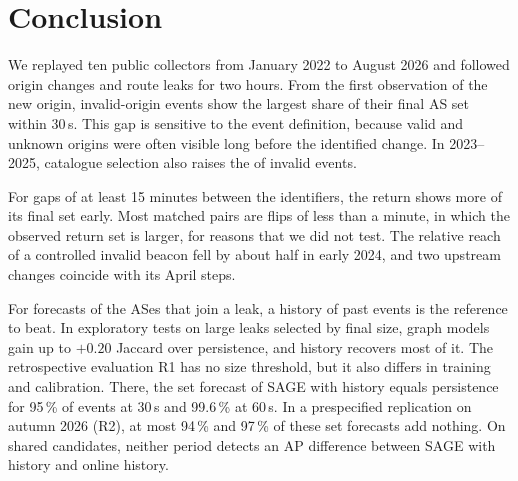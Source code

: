 \section{Conclusion}\label{sec:conclusion}

We replayed ten public collectors from January 2022 to August 2026 and followed origin changes and route leaks for two hours.
From the first observation of the new origin, invalid-origin events show the largest share of their final AS set within 30\,s.
This gap is sensitive to the event definition, because valid and unknown origins were often visible long before the identified change.
In 2023--2025, catalogue selection also raises the \floor of invalid events.

For gaps of at least 15 minutes between the identifiers, the return shows more of its final set early.
Most matched pairs are flips of less than a minute, in which the observed return set is larger, for reasons that we did not test.
The relative reach of a controlled invalid beacon fell by about half in early 2024, and two upstream changes coincide with its April steps.

For forecasts of the ASes that join a leak, a history of past events is the reference to beat.
In exploratory tests on large leaks selected by final size, graph models gain up to $+0.20$ Jaccard over persistence, and history recovers most of it.
The retrospective evaluation R1 has no size threshold, but it also differs in training and calibration.
There, the set forecast of SAGE with history equals persistence for 95\,\% of events at 30\,s and 99.6\,\% at 60\,s.
In a prespecified replication on autumn 2026 (R2), at most 94\,\% and 97\,\% of these set forecasts add nothing.
On shared candidates, neither period detects an AP difference between SAGE with history and online history.

